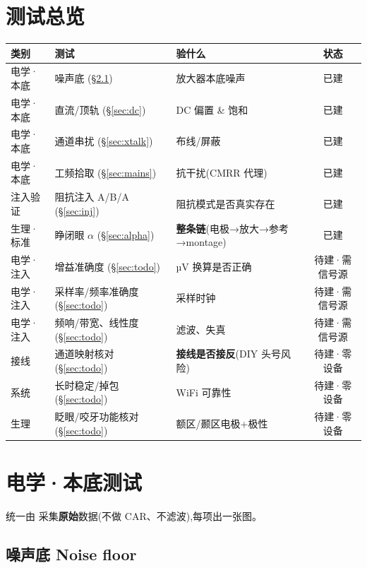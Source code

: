 \documentclass[11pt]{ctexart}
\begin{document}
\section{测试总览}
\begin{center}
\small
\begin{tabular}{@{}lllc@{}}
\toprule
类别 & 测试 & 验什么 & 状态 \\
\midrule
电学·本底 & 噪声底 (§\ref{sec:noise}) & 放大器本底噪声 & \textcolor{good}{已建} \\
电学·本底 & 直流/顶轨 (§\ref{sec:dc}) & DC 偏置 \& 饱和 & \textcolor{good}{已建} \\
电学·本底 & 通道串扰 (§\ref{sec:xtalk}) & 布线/屏蔽 & \textcolor{good}{已建} \\
电学·本底 & 工频拾取 (§\ref{sec:mains}) & 抗干扰(CMRR 代理) & \textcolor{good}{已建} \\
注入验证 & 阻抗注入 A/B/A (§\ref{sec:inj}) & 阻抗模式是否真实存在 & \textcolor{good}{已建} \\
生理·标准 & 睁闭眼 $\alpha$ (§\ref{sec:alpha}) & \textbf{整条链}(电极→放大→参考→montage) & \textcolor{good}{已建} \\
\midrule
电学·注入 & 增益准确度 (§\ref{sec:todo}) & µV 换算是否正确 & \textcolor{warn}{待建·需信号源} \\
电学·注入 & 采样率/频率准确度 (§\ref{sec:todo}) & 采样时钟 & \textcolor{warn}{待建·需信号源} \\
电学·注入 & 频响/带宽、线性度 (§\ref{sec:todo}) & 滤波、失真 & \textcolor{warn}{待建·需信号源} \\
接线 & 通道映射核对 (§\ref{sec:todo}) & \textbf{接线是否接反}(DIY 头号风险) & \textcolor{warn}{待建·零设备} \\
系统 & 长时稳定/掉包 (§\ref{sec:todo}) & WiFi 可靠性 & \textcolor{warn}{待建·零设备} \\
生理 & 眨眼/咬牙功能核对 (§\ref{sec:todo}) & 额区/颞区电极+极性 & \textcolor{warn}{待建·零设备} \\
\bottomrule
\end{tabular}
\end{center}

\section{电学·本底测试}
统一由  采集\textbf{原始}数据(不做 CAR、不滤波),每项出一张图。

\subsection{噪声底 Noise floor}\label{sec:noise}
\end{document}
